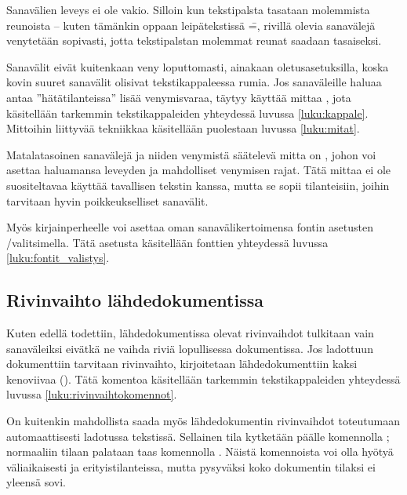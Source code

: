 Sanavälien leveys ei ole vakio. Silloin kun tekstipalsta tasataan
molemmista reunoista -- kuten tämänkin oppaan leipätekstissä \==,
rivillä olevia sanavälejä venytetään sopivasti, jotta tekstipalstan
molemmat reunat saadaan tasaiseksi.

Sanavälit eivät kuitenkaan veny loputtomasti, ainakaan
oletusasetuksilla, koska kovin suuret sanavälit olisivat
tekstikappaleessa rumia. Jos sanaväleille haluaa antaa
''hätätilanteissa'' lisää venymisvaraa, täytyy käyttää mittaa
, jota käsitellään tarkemmin tekstikappaleiden
yhteydessä luvussa \ref{luku:kappale}. Mittoihin liittyvää tekniikkaa
käsitellään puolestaan luvussa \ref{luku:mitat}.

Matalatasoinen sanavälejä ja niiden venymistä säätelevä mitta on
, johon voi asettaa haluamansa leveyden ja mahdolliset
venymisen rajat. Tätä mittaa ei ole suositeltavaa käyttää tavallisen
tekstin kanssa, mutta se sopii tilanteisiin, joihin tarvitaan hyvin
poikkeukselliset sanavälit.

\begin{koodilohkosis}
\setlength{\spaceskip}{0.8em plus 0.3em minus 0.2em}
\end{koodilohkosis}

Myös kirjainperheelle voi asettaa oman sanavälikertoimensa fontin
asetusten \-/valitsimella. Tätä asetusta käsitellään
fonttien yhteydessä luvussa \ref{luku:fontit_valistys}.

\subsection{Rivinvaihto lähdedokumentissa}
\label{luku:rivinvaihtomerkit}

Kuten edellä todettiin, lähdedokumentissa olevat rivinvaihdot tulkitaan
vain sanaväleiksi eivätkä ne vaihda riviä lopullisessa dokumentissa. Jos
ladottuun dokumenttiin tarvitaan rivinvaihto, kirjoitetaan
lähdedokumenttiin kaksi kenoviivaa (\komentom{\keno}). Tätä komentoa
käsitellään tarkemmin tekstikappaleiden yhteydessä luvussa
\ref{luku:rivinvaihtokomennot}.

On kuitenkin mahdollista saada myös lähdedokumentin rivinvaihdot
toteutumaan automaattisesti ladotussa tekstissä. Sellainen tila
kytketään päälle komennolla ; normaaliin tilaan
palataan taas komennolla . Näistä komennoista voi
olla hyötyä väliaikaisesti ja erityistilanteissa, mutta pysyväksi koko
dokumentin tilaksi  ei yleensä sovi.

